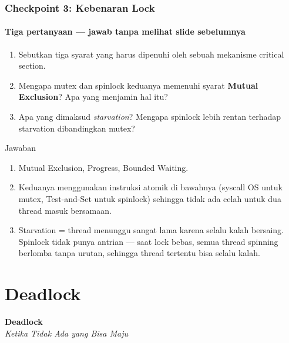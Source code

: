 \documentclass[t,aspectratio=169,xcolor=dvipsnames]{beamer}
\begin{document}
\begin{frame}[shrink=20]
    \frametitle{Checkpoint 3: Kebenaran Lock}
    \framesubtitle{Tiga pertanyaan — jawab tanpa melihat slide sebelumnya}
    \small

    \begin{enumerate}
        \item Sebutkan tiga syarat yang harus dipenuhi oleh sebuah mekanisme critical section.
        \item Mengapa mutex dan spinlock keduanya memenuhi syarat \textbf{Mutual Exclusion}? Apa yang menjamin hal itu?
        \item Apa yang dimaksud \textit{starvation}? Mengapa spinlock lebih rentan terhadap starvation dibandingkan mutex?
    \end{enumerate}

    \begin{block}{Jawaban}
        \footnotesize
        \begin{enumerate}
            \item Mutual Exclusion, Progress, Bounded Waiting.
            \item Keduanya menggunakan instruksi atomik di bawahnya (syscall OS untuk mutex, Test-and-Set untuk spinlock) sehingga tidak ada celah untuk dua thread masuk bersamaan.
            \item Starvation = thread menunggu sangat lama karena selalu kalah bersaing. Spinlock tidak punya antrian — saat lock bebas, semua thread spinning berlomba tanpa urutan, sehingga thread tertentu bisa selalu kalah.
        \end{enumerate}
    \end{block}
\end{frame}

\section{Deadlock}

\begin{frame}[plain]
    \begin{center}
        \vspace{3cm}
        \Huge\textbf{Deadlock}\\[0.4em]
        \Large\textit{Ketika Tidak Ada yang Bisa Maju}
    \end{center}
\end{frame}
\end{document}
